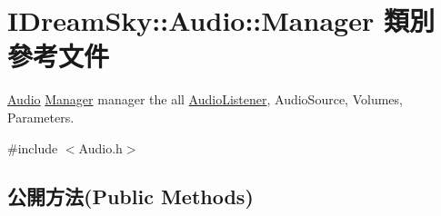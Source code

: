 \hypertarget{class_i_dream_sky_1_1_audio_1_1_manager}{}\section{I\+Dream\+Sky\+:\+:Audio\+:\+:Manager 類別 參考文件}
\label{class_i_dream_sky_1_1_audio_1_1_manager}


\hyperlink{class_i_dream_sky_1_1_audio}{Audio} \hyperlink{class_i_dream_sky_1_1_audio_1_1_manager}{Manager} manager the all \hyperlink{class_i_dream_sky_1_1_audio_listener}{Audio\+Listener}, Audio\+Source, Volumes, Parameters.  




{\ttfamily \#include $<$Audio.\+h$>$}

\subsection*{公開方法(Public Methods)}
